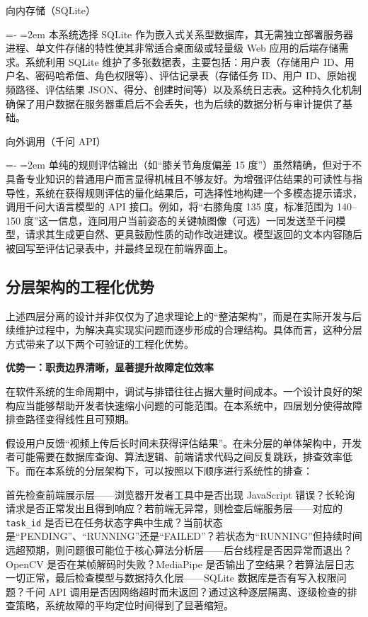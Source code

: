 \documentclass[UTF8,twoside]{ctexrep}
\makeatletter
\def@NAT@last@yr{\@citea}%
\def@NAT@last@yr{-\NAT@penalty}%
\newcommand{\researchitem}[2]{%
  \item #1%
  \par\begingroup
    \leftskip=-\leftmargin
    \rightskip=0pt
    \parindent=2em
    \noindent\hspace*{2em}\ignorespaces#2\unskip\par
  \endgroup
}
\makeatother
\begin{document}
\begin{researchlist}
  
\researchitem{向内存储（SQLite）}{本系统选择 SQLite 作为嵌入式关系型数据库，其无需独立部署服务器进程、单文件存储的特性使其非常适合桌面级或轻量级 Web 应用的后端存储需求。系统利用 SQLite 维护了多张数据表，主要包括：用户表（存储用户 ID、用户名、密码哈希值、角色权限等）、评估记录表（存储任务 ID、用户 ID、原始视频路径、评估结果 JSON、得分、创建时间等）以及系统日志表。这种持久化机制确保了用户数据在服务器重启后不会丢失，也为后续的数据分析与审计提供了基础。}

  
\researchitem{向外调用（千问 API）}{单纯的规则评估输出（如“膝关节角度偏差 15 度”）虽然精确，但对于不具备专业知识的普通用户而言显得机械且不够友好。为增强评估结果的可读性与指导性，系统在获得规则评估的量化结果后，可选择性地构建一个多模态提示请求，调用千问大语言模型的 API 接口。例如，将“右膝角度 135 度，标准范围为 140--150 度”这一信息，连同用户当前姿态的关键帧图像（可选）一同发送至千问模型，请求其生成更自然、更具鼓励性质的动作改进建议。模型返回的文本内容随后被回写至评估记录表中，并最终呈现在前端界面上。}
\end{researchlist}

\subsection{分层架构的工程化优势}

上述四层分离的设计并非仅仅为了追求理论上的“整洁架构”，而是在实际开发与后续维护过程中，为解决真实现实问题而逐步形成的合理结构。具体而言，这种分层方式带来了以下两个可验证的工程化优势。

\textbf{优势一：职责边界清晰，显著提升故障定位效率}

在软件系统的生命周期中，调试与排错往往占据大量时间成本。一个设计良好的架构应当能够帮助开发者快速缩小问题的可能范围。在本系统中，四层划分使得故障排查路径变得线性且可预期。

假设用户反馈“视频上传后长时间未获得评估结果”。在未分层的单体架构中，开发者可能需要在数据库查询、算法逻辑、前端请求代码之间反复跳跃，排查效率低下。而在本系统的分层架构下，可以按照以下顺序进行系统性的排查：

首先检查前端展示层——浏览器开发者工具中是否出现 JavaScript 错误？长轮询请求是否正常发出且得到响应？若前端无异常，则检查后端服务层——对应的 \texttt{task\_id} 是否已在任务状态字典中生成？当前状态是“PENDING”、“RUNNING”还是“FAILED”？若状态为“RUNNING”但持续时间远超预期，则问题很可能位于核心算法分析层——后台线程是否因异常而退出？OpenCV 是否在某帧解码时失败？MediaPipe 是否输出了空结果？若算法层日志一切正常，最后检查模型与数据持久化层——SQLite 数据库是否有写入权限问题？千问 API 调用是否因网络超时而未返回？通过这种逐层隔离、逐级检查的排查策略，系统故障的平均定位时间得到了显著缩短。
\end{document}
